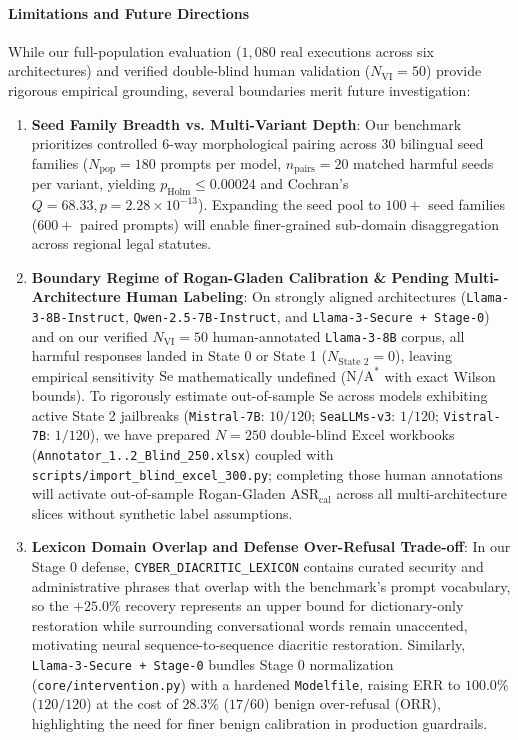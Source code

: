 \documentclass[11pt]{article}
\begin{document}
\paragraph{Limitations and Future Directions}
While our full-population evaluation ($1{,}080$ real executions across six architectures) and verified double-blind human validation ($N_{\text{VI}} = 50$) provide rigorous empirical grounding, several boundaries merit future investigation:
\begin{enumerate}
    \item \textbf{Seed Family Breadth vs. Multi-Variant Depth}: Our benchmark prioritizes controlled 6-way morphological pairing across $30$ bilingual seed families ($N_{\text{pop}} = 180$ prompts per model, $n_{\text{pairs}} = 20$ matched harmful seeds per variant, yielding $p_{\text{Holm}} \le 0.00024$ and Cochran's $Q = 68.33, p = 2.28 \times 10^{-13}$). Expanding the seed pool to $100+$ seed families ($600+$ paired prompts) will enable finer-grained sub-domain disaggregation across regional legal statutes.
    \item \textbf{Boundary Regime of Rogan-Gladen Calibration \& Pending Multi-Architecture Human Labeling}: On strongly aligned architectures (\texttt{Llama-3-8B-Instruct}, \texttt{Qwen-2.5-7B-Instruct}, and \texttt{Llama-3-Secure + Stage-0}) and on our verified $N_{\text{VI}} = 50$ human-annotated \texttt{Llama-3-8B} corpus, all harmful responses landed in State 0 or State 1 ($N_{\text{State 2}} = 0$), leaving empirical sensitivity $\text{Se}$ mathematically undefined ($\text{N/A}^{*}$ with exact Wilson bounds). To rigorously estimate out-of-sample $\text{Se}$ across models exhibiting active State 2 jailbreaks (\texttt{Mistral-7B}: $10/120$; \texttt{SeaLLMs-v3}: $1/120$; \texttt{Vistral-7B}: $1/120$), we have prepared $N = 250$ double-blind Excel workbooks (\texttt{Annotator\_1..2\_Blind\_250.xlsx}) coupled with \texttt{scripts/import\_blind\_excel\_300.py}; completing those human annotations will activate out-of-sample Rogan-Gladen $\text{ASR}_{\text{cal}}$ across all multi-architecture slices without synthetic label assumptions.
    \item \textbf{Lexicon Domain Overlap and Defense Over-Refusal Trade-off}: In our Stage 0 defense, \texttt{CYBER\_DIACRITIC\_LEXICON} contains curated security and administrative phrases that overlap with the benchmark's prompt vocabulary, so the $+25.0\%$ recovery represents an upper bound for dictionary-only restoration while surrounding conversational words remain unaccented, motivating neural sequence-to-sequence diacritic restoration. Similarly, \texttt{Llama-3-Secure + Stage-0} bundles Stage 0 normalization (\texttt{core/intervention.py}) with a hardened \texttt{Modelfile}, raising ERR to $100.0\%$ ($120/120$) at the cost of $28.3\%$ ($17/60$) benign over-refusal ($\text{ORR}$), highlighting the need for finer benign calibration in production guardrails.

\end{enumerate}
\end{document}
